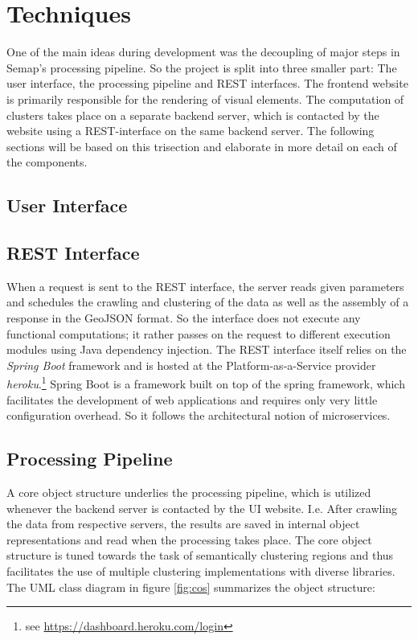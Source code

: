 \section{Techniques}
One of the main ideas during development was the decoupling of major steps in Semap’s processing pipeline. So the project is split into three smaller part: The user interface, the processing pipeline and REST interfaces. 
The frontend website is primarily responsible for the rendering of visual elements. The computation of clusters takes place on a separate backend server, which is contacted by the website using a REST-interface on the same backend server. The following sections will be based on this trisection and elaborate in more detail on each of the components.

\subsection{User Interface}


\subsection{REST Interface}
When a request is sent to the REST interface, the server reads given parameters and schedules the crawling and clustering of the data as well as the assembly of a response in the GeoJSON format. So the interface does not execute any functional computations; it rather passes on the request to different execution modules using Java dependency injection. The REST interface itself relies on the \textit{Spring Boot} framework and is hosted at the Platform-as-a-Service provider \textit{heroku}.\footnote{see \url{https://dashboard.heroku.com/login}} Spring Boot is a framework built on top of the spring framework, which facilitates the development of web applications and requires only very little configuration overhead. So it follows the architectural notion of microservices. 


\subsection{Processing Pipeline}
A core object structure underlies the processing pipeline, which is utilized whenever the backend server is contacted by the UI website. I.e. After crawling the data from respective servers, the results are saved in internal object representations and read when the processing takes place. The core object structure is tuned towards the task of semantically clustering regions and thus facilitates the use of multiple clustering implementations with diverse libraries. The UML class diagram in figure \ref{fig:cos} summarizes the object structure:
 
